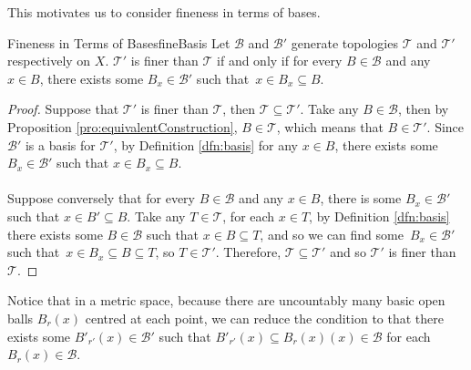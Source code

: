 \documentclass[math]{amznotes}
\theoremstyle{remark}
\begin{document}
This motivates us to consider fineness in terms of bases.
\begin{probox}{Fineness in Terms of Bases}{fineBasis}
    Let $\mathcal{B}$ and $\mathcal{B}'$ generate topologies $\mathcal{T}$ and $\mathcal{T}'$ respectively on $X$. $\mathcal{T}'$ is finer than $\mathcal{T}$ if and only if for every $B \in \mathcal{B}$ and any $x \in B$, there exists some $B_x \in \mathcal{B}'$ such that~$x \in B_x \subseteq B$.
    \tcblower
    \begin{proof}
        Suppose that $\mathcal{T}'$ is finer than $\mathcal{T}$, then $\mathcal{T} \subseteq \mathcal{T}'$. Take any $B \in \mathcal{B}$, then by Proposition \ref{pro:equivalentConstruction}, $B \in \mathcal{T}$, which means that $B \in \mathcal{T}'$. Since $\mathcal{B}'$ is a basis for $\mathcal{T}'$, by Definition \ref{dfn:basis} for any $x \in B$, there exists some $B_x \in \mathcal{B}'$ such that $x \in B_x \subseteq B$.
        \\\\
        Suppose conversely that for every $B \in \mathcal{B}$ and any $x \in B$, there is some $B_x \in \mathcal{B}'$ such that $x \in B' \subseteq B$. Take any $T \in \mathcal{T}$, for each $x \in T$, by Definition \ref{dfn:basis} there exists some $B \in \mathcal{B}$ such that $x \in B \subseteq T$, and so we can find some~$B_x \in \mathcal{B}'$ such that~$x \in B_x \subseteq B \subseteq T$, so $T \in \mathcal{T}'$. Therefore, $\mathcal{T} \subseteq \mathcal{T}'$ and so $\mathcal{T}'$ is finer than~$\mathcal{T}$.
    \end{proof}
\end{probox}
Notice that in a metric space, because there are uncountably many basic open balls $B_r\left(x\right)$ centred at each point, we can reduce the condition to that there exists some $B'_{r'}\left(x\right) \in \mathcal{B}'$ such that $B'_{r'}\left(x\right) \subseteq B_r\left(x\right)\left(x\right) \in \mathcal{B}$ for each $B_r\left(x\right) \in \mathcal{B}$.
\end{document}

